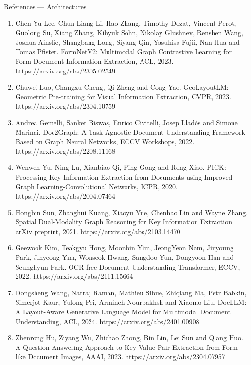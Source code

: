 \documentclass[aspectratio=169, 11pt]{beamer}
\begin{document}
\begin{frame}{References — Architectures}
{\begin{enumerate}
    \item Chen-Yu Lee, Chun-Liang Li, Hao Zhang, Timothy Dozat, Vincent Perot, Guolong Su, Xiang Zhang, Kihyuk Sohn, Nikolay Glushnev, Renshen Wang, Joshua Ainslie, Shangbang Long, Siyang Qin, Yasuhisa Fujii, Nan Hua and Tomas Pfister. FormNetV2: Multimodal Graph Contrastive Learning for Form Document Information Extraction, ACL, 2023. https://arxiv.org/abs/2305.02549
    \item Chuwei Luo, Changxu Cheng, Qi Zheng and Cong Yao. GeoLayoutLM: Geometric Pre-training for Visual Information Extraction, CVPR, 2023. https://arxiv.org/abs/2304.10759
    \item Andrea Gemelli, Sanket Biswas, Enrico Civitelli, Josep Lladós and Simone Marinai. Doc2Graph: A Task Agnostic Document Understanding Framework Based on Graph Neural Networks, ECCV Workshops, 2022. https://arxiv.org/abs/2208.11168
    \item Wenwen Yu, Ning Lu, Xianbiao Qi, Ping Gong and Rong Xiao. PICK: Processing Key Information Extraction from Documents using Improved Graph Learning-Convolutional Networks, ICPR, 2020. https://arxiv.org/abs/2004.07464
    \item Hongbin Sun, Zhanghui Kuang, Xiaoyu Yue, Chenhao Lin and Wayne Zhang. Spatial Dual-Modality Graph Reasoning for Key Information Extraction, arXiv preprint, 2021. https://arxiv.org/abs/2103.14470
    \item Geewook Kim, Teakgyu Hong, Moonbin Yim, JeongYeon Nam, Jinyoung Park, Jinyeong Yim, Wonseok Hwang, Sangdoo Yun, Dongyoon Han and Seunghyun Park. OCR-free Document Understanding Transformer, ECCV, 2022. https://arxiv.org/abs/2111.15664
    \item Dongsheng Wang, Natraj Raman, Mathieu Sibue, Zhiqiang Ma, Petr Babkin, Simerjot Kaur, Yulong Pei, Armineh Nourbakhsh and Xiaomo Liu. DocLLM: A Layout-Aware Generative Language Model for Multimodal Document Understanding, ACL, 2024. https://arxiv.org/abs/2401.00908
    \item Zhenrong Hu, Ziyang Wu, Zhichao Zhong, Bin Lin, Lei Sun and Qiang Huo. A Question-Answering Approach to Key Value Pair Extraction from Form-like Document Images, AAAI, 2023. https://arxiv.org/abs/2304.07957
  \end{enumerate}}
\end{frame}
\end{document}
